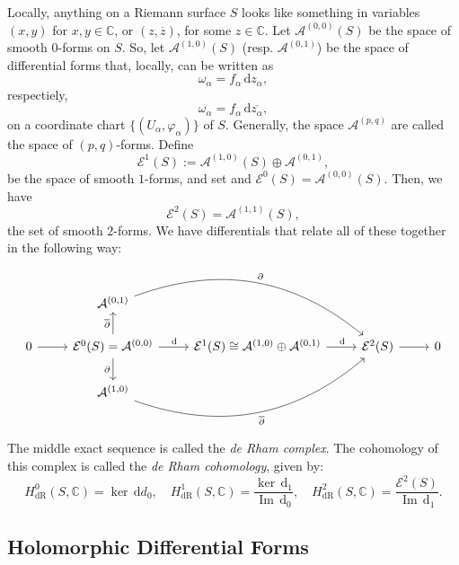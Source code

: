 \documentclass[a4paper]{report}
\theoremstyle{definition}
\theoremstyle{remark}
\theoremstyle{proposition}
\theoremstyle{conjecture}
\theoremstyle{lemma}
\theoremstyle{corollary}
\theoremstyle{exercise}
\theoremstyle{example}
\newcommand{\C}{\mathbb{C}}
\newcommand{\mcal}{\mathcal}
\newcommand{\diff}{\,\mathrm{d}}
\newcommand{\on}{\operatorname}
\begin{document}
Locally, anything on a Riemann surface $S$ looks like something in variables
$(x,y)$ for $x,y\in \C$, or $(z,\overline{z})$, for some $z\in \C$.
Let $\mcal{A}^{(0,0)}(S)$ be the space of smooth $0$-forms on $S$.
So, let $\mcal{A}^{(1,0)}(S)$ (resp. $\mcal{A}^{(0,1)}$) be the space 
of differential forms that, locally, can be written as 
$$\omega_\alpha = f_\alpha\diff z_\alpha,$$
respectiely,
$$\omega_\alpha = f_\alpha \diff\overline{z_\alpha},$$
on a coordinate chart $\lbrace (U_\alpha,\varphi_\alpha)\rbrace$ of $S$.
Generally, the space $\mcal{A}^{(p,q)}$ are called the space 
of $(p,q)$-forms. 
Define 
$$\mcal{E}^1(S) := \mcal{A}^{(1,0)}(S) \oplus \mcal{A}^{(0,1)},$$
be the space of smooth $1$-forms, and set
and $\mcal{E}^0(S) = \mcal{A}^{(0,0)}(S)$. 
Then, we have $$\mcal{E}^2(S) = \mcal{A}^{(1,1)}(S),$$
the set of smooth $2$-forms.
We have differentials that relate all of these together in the following way:
$$\begin{tikzcd}
            & {\mcal{A}^{(0,1)}} \arrow[rrd, "\partial", bend left]                                                         &                                                                                  &                         &   \\
0 \arrow[r] & {\mcal{E}^0(S) = \mcal{A}^{(0,0)}} \arrow[u, "\overline{\partial}"] \arrow[r, "\diff"] \arrow[d, "\partial"'] & {\mcal{E}^1(S) \cong \mcal{A}^{(1,0)}\oplus \mcal{A}^{(0,1)}} \arrow[r, "\diff"] & \mcal{E}^2(S) \arrow[r] & 0 \\
            & {\mcal{A}^{(1,0)}} \arrow[rru, "\overline{\partial}"', bend right]                                            &                                                                                  &                         &  
\end{tikzcd}$$
The middle exact sequence is called the \emph{de Rham complex}. The cohomology
of this complex is called the \emph{de Rham cohomology}, given by:
$$H^0_{\on{dR}}(S,\C) = \ker \diff d_0,\quad H^1_{\on{dR}}(S,\C) = \frac{\ker \diff_1}{\on{Im}\diff_0},\quad H^2_{\on{dR}}(S,\C) = \frac{\mcal{E}^2(S)}{\on{Im}\diff_1}.$$

\subsection{Holomorphic Differential Forms}
\end{document}
